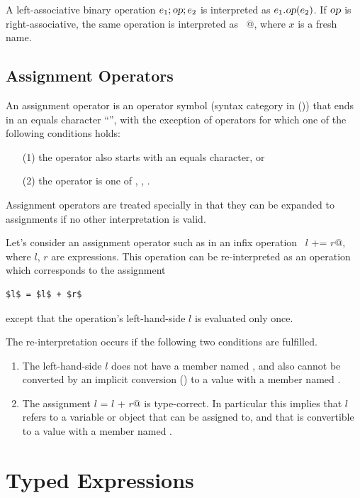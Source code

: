 A left-associative binary
operation $e_1;\mbox{\sl op};e_2$ is interpreted as $e_1.\mbox{\sl op}(e_2)$. If $\mbox{\sl op}$ is
right-associative, the same operation is interpreted as
~@, where $x$ is a fresh
name. 

\subsection{Assignment Operators} \label{sec:assops}

An assignment operator is an operator symbol (syntax category
\lstinline@op@ in ()) that ends in an equals character
``\code{=}'', with the exception of operators for which one of 
the following conditions holds:
\begin{itemize}
\item[(1)] the operator also starts with an equals character, or
\item[(2)] the operator is one of \code{(<=)}, \code{(>=)},
  \code{(!=)}.
\end{itemize}

Assignment operators are treated specially in that they
can be expanded to assignments if no other interpretation is valid.

Let's consider an assignment operator such as \code{+=} in an infix
operation ~\lstinline@$l$ += $r$@, where $l$, $r$ are expressions.  
This operation can be re-interpreted as an operation which corresponds 
to the assignment
\begin{lstlisting}
$l$ = $l$ + $r$
\end{lstlisting}
except that the operation's left-hand-side $l$ is evaluated only once.

The re-interpretation occurs if the following two conditions are fulfilled.
\begin{enumerate}
\item 
The left-hand-side $l$ does not have a member named
\code{+=}, and also cannot be converted by an implicit conversion ()
to a value with a member named \code{+=}.
\item
The assignment \lstinline@$l$ = $l$ + $r$@ is type-correct. 
In particular this implies that $l$ refers to a variable or object 
that can be assigned to, and that is convertible to a value with a member named \code{+}.
\end{enumerate}

\section{Typed Expressions}

